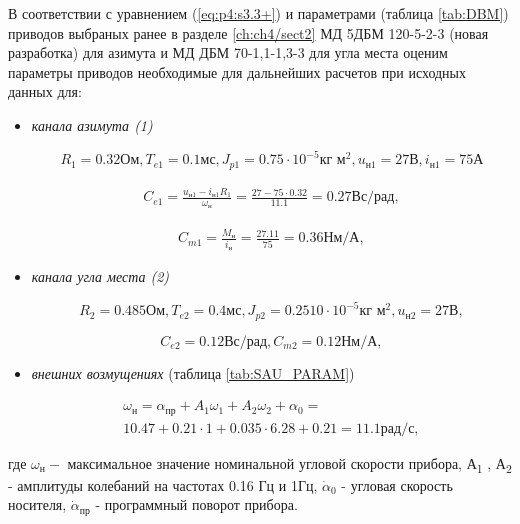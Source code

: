 В соответствии с уравнением (\ref{eq:p4:s3.3+}) и параметрами (таблица \ref{tab:DBM}) приводов выбраных ранее в разделе \ref{ch:ch4/sect2} МД 5ДБМ 120-5-2-3 (новая разработка) для азимута и МД ДБМ 70-1,1-1,3-3 для угла места оценим параметры приводов необходимые для дальнейших расчетов при исходных данных для:
\begin{itemize}
	\item \textit{канала азимута (1)}
	
	\[  R_1 = 0.32 \textit{Ом}, 
	T_{e1} = 0.1 \textit{мс}, 
	J_{p1} = 0.75 \cdot 10^{-5} \textit{кг м}^2,  
	u_\textit{н1} = 27 \textit{В},
	i_\textit{н1} = 75 \textit{А} \]
	
	\begin{equation}
	\label{eq:p4:sec4/2}
	\begin{multlined}
	C_{e1}=
	\frac{u_\textit{н1}-i_{\textit{н1}}R_{1}}{ \omega _{\textit{н}}}=
	\frac{27-75 \cdot 0.32}{11.1}=
	0.27 \textit{Вс/рад},
	\end{multlined}
	\end{equation}
	
	\begin{equation}
	\label{eq:p4:sec4/3}
	\begin{multlined}
	C_{m1}=
	\frac{M_{\textit{н}}}{i_{\textit{н}}}=
	\frac{27.11}{75}=0.36 \textit{Нм/А},
	\end{multlined}
	\end{equation}
	
	\item \textit{канала угла места (2)}
	
	\[  R_2 = 0.485 \textit{Ом}, 
	T_{e2} = 0.4 \textit{мс}, 
	J_{p2} = 0.2510 \cdot 10^{-5} \textit{кг м}^2,  
	u_\textit{н2} = 27 \textit{В},\]
	
	\[C_{e2} = 0.12 \textit{Вс/рад}, 
	C_{m2} = 0.12 \textit{Нм/А},
	\]
	
	\item \textit{внешних возмущениях} (таблица \ref{tab:SAU_PARAM})
	
	\begin{equation}
	\label{eq:p4:sec4/1}
	\begin{multlined}
	\omega _{\textit{н}}=
	\alpha _{\textit{пр}} + A_{1} \omega _{1} + A_{2} \omega _{2} + \alpha _{0} =\\
	10.47 + 0.21 \cdot 1 + 0.035 \cdot 6.28 + 0.21 = 11.1 \textit{рад/с},
	\end{multlined}
	\end{equation}

\end{itemize}
где  \(  \omega _{\textit{н}}- \) максимальное значение номинальной угловой скорости прибора, А\textsubscript{1} , А\textsubscript{2 }- амплитуды колебаний на частотах 0.16 Гц и 1Гц,  \( \dot \alpha _{0} \)  - угловая скорость носителя,  \( \dot \alpha _{\textit{пр}} \) - программный поворот прибора.

